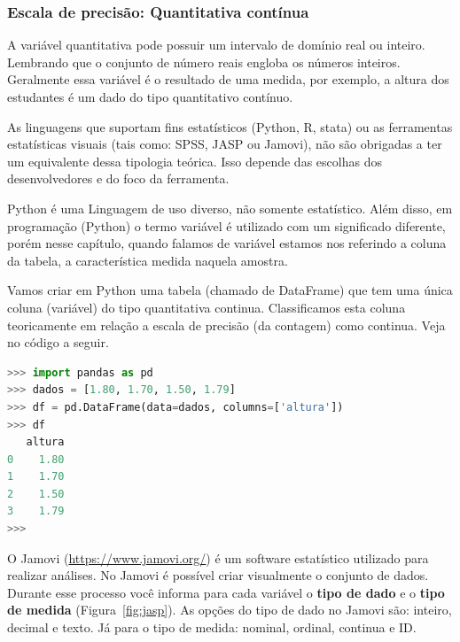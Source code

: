 \subsubsection{Escala de precisão: Quantitativa contínua}

A  variável quantitativa pode possuir um intervalo de domínio real ou inteiro. Lembrando que o conjunto de número reais engloba os números inteiros. Geralmente essa variável é o resultado de uma medida, por exemplo, a altura dos estudantes é um dado do tipo quantitativo contínuo.

As linguagens que suportam fins estatísticos (Python, R, stata) ou as ferramentas estatísticas visuais (tais como: SPSS, JASP ou Jamovi), não são obrigadas a ter um equivalente dessa tipologia teórica. Isso depende das escolhas dos desenvolvedores e do foco da ferramenta.

Python é uma Linguagem de uso diverso, não somente estatístico. Além disso, em programação (Python) o termo variável é utilizado com um significado diferente, porém nesse capítulo, quando falamos de variável estamos nos referindo a coluna da tabela, a característica medida naquela amostra.

Vamos criar em Python uma tabela (chamado de DataFrame) que tem uma única coluna (variável) do tipo quantitativa continua. Classificamos esta coluna teoricamente em relação a escala de precisão (da contagem) como continua. Veja no código a seguir.

\begin{lstlisting}[language=Python, caption={Código que cria e exibe uma tabela em Python com uma coluna. A classificação teórica dessa variável é quantitativa continua.}]
>>> import pandas as pd
>>> dados = [1.80, 1.70, 1.50, 1.79]
>>> df = pd.DataFrame(data=dados, columns=['altura'])
>>> df
   altura
0    1.80
1    1.70
2    1.50
3    1.79
>>>
\end{lstlisting}

O Jamovi (\url{https://www.jamovi.org/}) é um software estatístico utilizado para realizar análises. No Jamovi é possível criar visualmente o conjunto de dados. Durante esse processo você informa para cada variável o \textbf{tipo de dado} e o \textbf{tipo de medida} (Figura~\ref{fig:jasp}). As opções do tipo de dado no Jamovi são: inteiro, decimal e texto. Já para o tipo de medida: nominal, ordinal, continua e ID.

